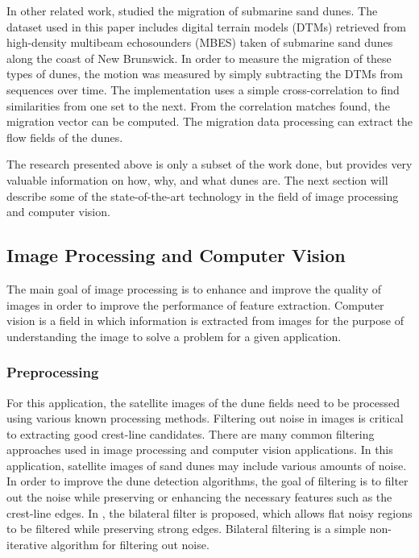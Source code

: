 In other related work, \cite{Application_spatial_cross_correlation_detection_submarine_dunes} studied the migration of submarine sand dunes. The dataset used in this paper includes digital terrain models (DTMs) retrieved from high-density multibeam echosounders (MBES) taken of submarine sand dunes along the coast of New Brunswick. In order to measure the migration of these types of dunes, the motion was measured by simply subtracting the DTMs from sequences over time. The implementation uses a simple cross-correlation to find similarities from one set to the next. From the correlation matches found, the migration vector can be computed. The migration data processing can extract the flow fields of the dunes.

The research presented above is only a subset of the work done, but provides very valuable information on how, why, and what dunes are. The next section will describe some of the state-of-the-art technology in the field of image processing and computer vision. 
 
\subsection{Image Processing and Computer Vision} \label{subsec:image_processing_cv}

The main goal of image processing is to enhance and improve the quality of images in order to improve the performance of feature extraction. Computer vision is a field in which information is extracted from images for the purpose of understanding the image to solve a problem for a given application.

\subsubsection{Preprocessing}

For this application, the satellite images of the dune fields need to be processed using various known processing methods. Filtering out noise in images is critical to extracting good crest-line candidates. There are many common filtering approaches used in image processing and computer vision applications. In this application, satellite images of sand dunes may include various amounts of noise. In order to improve the dune detection algorithms, the goal of filtering is to filter out the noise while preserving or enhancing the necessary features such as the crest-line edges. In \cite{Bilateral-filtering-gray-color-images}, the bilateral filter is proposed, which allows flat noisy regions to be filtered while preserving strong edges. Bilateral filtering	is a simple non-iterative algorithm for filtering out noise.


